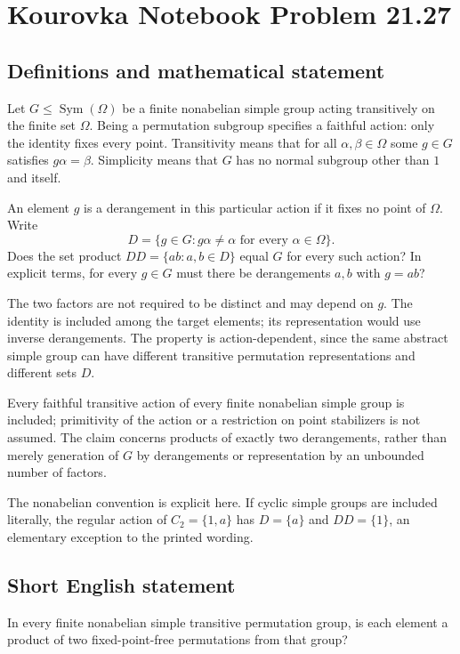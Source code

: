 \documentclass[11pt,a4paper]{article}
\begin{document}
\section*{Kourovka Notebook Problem 21.27}\label{statement}

\subsection{Definitions and mathematical statement}
Let $G\le\operatorname{Sym}(\Omega)$ be a finite nonabelian simple group
acting transitively on the finite set $\Omega$. Being a permutation
subgroup specifies a faithful action: only the identity fixes every
point. Transitivity means that for all $\alpha,\beta\in\Omega$ some
$g\in G$ satisfies $g\alpha=\beta$. Simplicity means that $G$ has no
normal subgroup other than $1$ and itself.

An element $g$ is a derangement in this particular action if it fixes
no point of $\Omega$. Write
\[
 D=\{g\in G:g\alpha\ne\alpha\text{ for every }\alpha\in\Omega\}.
\]
Does the set product $DD=\{ab:a,b\in D\}$ equal $G$ for every such
action? In explicit terms, for every $g\in G$ must there be derangements
$a,b$ with $g=ab$?

The two factors are not required to be distinct and may depend on $g$.
The identity is included among the target elements; its representation
would use inverse derangements. The property is action-dependent, since
the same abstract simple group can have different transitive permutation
representations and different sets $D$.

Every faithful transitive action of every finite nonabelian simple group is included;
primitivity of the action or a restriction on point stabilizers is not
assumed. The claim concerns products of exactly two derangements, rather
than merely generation of $G$ by derangements or representation by an
unbounded number of factors.

The nonabelian convention is explicit here. If cyclic simple groups are
included literally, the regular action of $C_2=\{1,a\}$ has
$D=\{a\}$ and $DD=\{1\}$, an elementary exception to the printed wording.
\subsection{Short English statement}
In every finite nonabelian simple transitive permutation group, is each element a product of two fixed-point-free permutations from that group?
\end{document}
